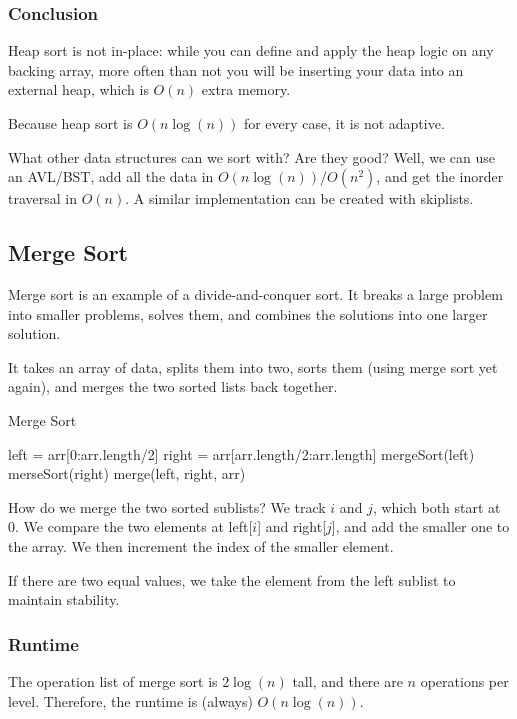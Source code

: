 \documentclass[a4paper]{article}
\begin{document}
\subsubsection{Conclusion}
Heap sort is not in-place: while you can define and apply the heap logic on any backing array, more often than not you will be inserting your data into an external heap, which is \( O(n) \) extra memory.

Because heap sort is \( O(n\log (n)) \) for every case, it is not adaptive.

\begin{note}
	What other data structures can we sort with? Are they good? Well, we can use an AVL/BST, add all the data in \( O(n\log (n)) \)/\( O(n^2) \), and get the inorder traversal in \( O(n) \). A similar implementation can be created with skiplists.
\end{note}


\subsection{Merge Sort}

Merge sort is an example of a divide-and-conquer sort. It breaks a large problem into smaller problems, solves them, and combines the solutions into one larger solution.

It takes an array of data, splits them into two, sorts them (using merge sort yet again), and merges the two sorted lists back together.

\begin{algorithm}
	\caption{Merge Sort}
	left = arr[0:arr.length/2]\;
	right = arr[arr.length/2:arr.length]\;
	mergeSort(left)\;
	merseSort(right)\;
	merge(left, right, arr)\;
\end{algorithm}

How do we merge the two sorted sublists? We track \( i \) and \( j \), which both start at 0. We compare the two elements at left[\( i \)] and right[\( j \)], and add the smaller one to the array. We then increment the index of the smaller element. 

\begin{note}
	If there  are two equal values, we take the element from the left sublist to maintain stability.
\end{note}

\subsubsection{Runtime}
The operation list of merge sort is \( 2\log (n) \) tall, and there are \( n \) operations per level. Therefore, the runtime is (always) \( O(n\log (n)) \).
\end{document}
